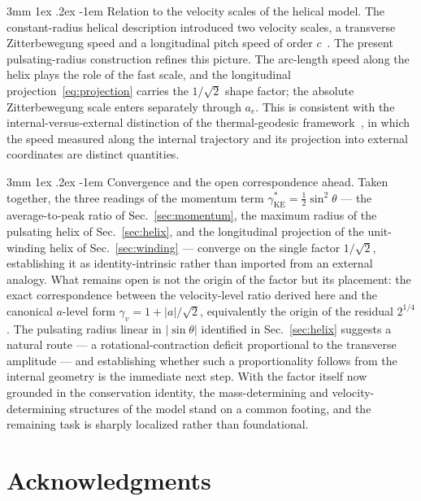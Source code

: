 \documentclass[%
 reprint, amsmath,amssymb, aps, prb, ]{revtex4-2}
\makeatletter
\numberwithin{equation}{section}
\renewcommand\paragraph{%
  \@startsection{paragraph}{4}{\z@}%
    {3mm \@plus 1ex \@minus .2ex}%
    {-1em}%
    {\normalfont\normalsize\itshape}}
\newcommand{\gKE}{\gamma^{*}_{\text{KE}}}
\makeatother
\begin{document}
\paragraph{Relation to the velocity scales of the helical model.}
The constant-radius helical description introduced two velocity scales, a transverse Zitterbewegung speed and a longitudinal pitch speed of order $c$~\cite{hanamura51}. The present pulsating-radius construction refines this picture. The arc-length speed along the helix plays the role of the fast scale, and the longitudinal projection~\eqref{eq:projection} carries the $1/\sqrt{2}$ shape factor; the absolute Zitterbewegung scale enters separately through $a_e$. This is consistent with the internal-versus-external distinction of the thermal-geodesic framework~\cite{hanamura24}, in which the speed measured along the internal trajectory and its projection into external coordinates are distinct quantities.

\paragraph{Convergence and the open correspondence ahead.}
Taken together, the three readings of the momentum term $\gKE=\tfrac{1}{2}\sin^2\theta$ --- the average-to-peak ratio of Sec.~\ref{sec:momentum}, the maximum radius of the pulsating helix of Sec.~\ref{sec:helix}, and the longitudinal projection of the unit-winding helix of Sec.~\ref{sec:winding} --- converge on the single factor $1/\sqrt{2}$, establishing it as identity-intrinsic rather than imported from an external analogy. What remains open is not the origin of the factor but its placement: the exact correspondence between the velocity-level ratio derived here and the canonical $a$-level form $\gamma_v = 1+\lvert a\rvert/\sqrt{2}$, equivalently the origin of the residual $2^{1/4}$. The pulsating radius linear in $\lvert\sin\theta\rvert$ identified in Sec.~\ref{sec:helix} suggests a natural route --- a rotational-contraction deficit proportional to the transverse amplitude --- and establishing whether such a proportionality follows from the internal geometry is the immediate next step. With the factor itself now grounded in the conservation identity, the mass-determining and velocity-determining structures of the model stand on a common footing, and the remaining task is sharply localized rather than foundational.

\section*{Acknowledgments}
\end{document}
